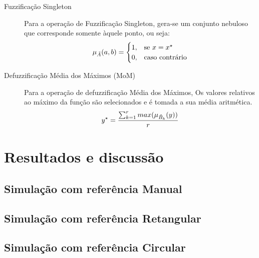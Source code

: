\begin{description}
                \item [Fuzzificação Singleton] Para a operação de Fuzzificação Singleton, gera-se um conjunto nebuloso que corresponde somente àquele ponto, ou seja:
                \begin{equation*}
                    \mu_{\tilde{A}}(a,b)=
                     \begin{cases}
                        1, & \text{se \textbf{$x=x^{\star}$}}\\
                        0, & \text{caso contrário}
                    \end{cases}      
                \end{equation*}
                \item [Defuzzificação Média dos Máximos (MoM)] Para a operação de defuzzificação Média dos Máximos, Os valores relativos ao máximo da função são selecionados e é tomada a sua média aritmética.
                \begin{equation*}
                    y^{\star}= \frac{\sum_{k=1}^{r} max(\mu_{\tilde{B}_k}(y))}{r}\\
                \end{equation*}
            \end{description}

\section{Resultados e discussão}

    \subsection{Simulação com referência Manual}

    \subsection{Simulação com referência Retangular}

    \subsection{Simulação com referência Circular}